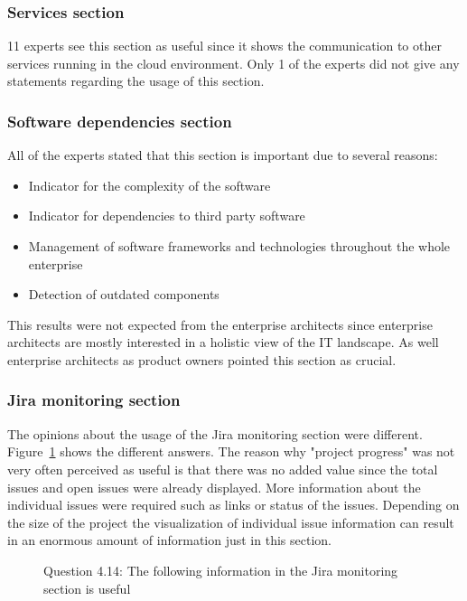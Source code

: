 \subsubsection{Services section}

11 experts see this section as useful since it shows the communication to other services running in the cloud environment. Only 1 of the experts did not give any statements regarding the usage of this section.

\subsubsection{Software dependencies section}

All of the experts stated that this section is important due to several reasons:
\begin{itemize}
    \item Indicator for the complexity of the software
    \item Indicator for dependencies to third party software
    \item Management of software frameworks and technologies throughout the whole enterprise
    \item Detection of outdated components
\end{itemize}
This results were not expected from the enterprise architects since enterprise architects are mostly interested in a holistic view of the IT landscape. As well enterprise architects as product owners pointed this section as crucial.

\subsubsection{Jira monitoring section}
The opinions about the usage of the Jira monitoring section were different. Figure~\ref{fig:question414} shows the different answers. The reason why "project progress" was not very often perceived as useful is that there was no added value since the total issues and open issues were already displayed. More information about the individual issues were required such as links or status of the issues. Depending on the size of the project the visualization of individual issue information can result in an enormous amount of information just in this section.
\begin{figure}[htpb]
\centering
{}
\caption{Question 4.14: The following information in the Jira monitoring section is useful}
\label{fig:question414}
\end{figure}

